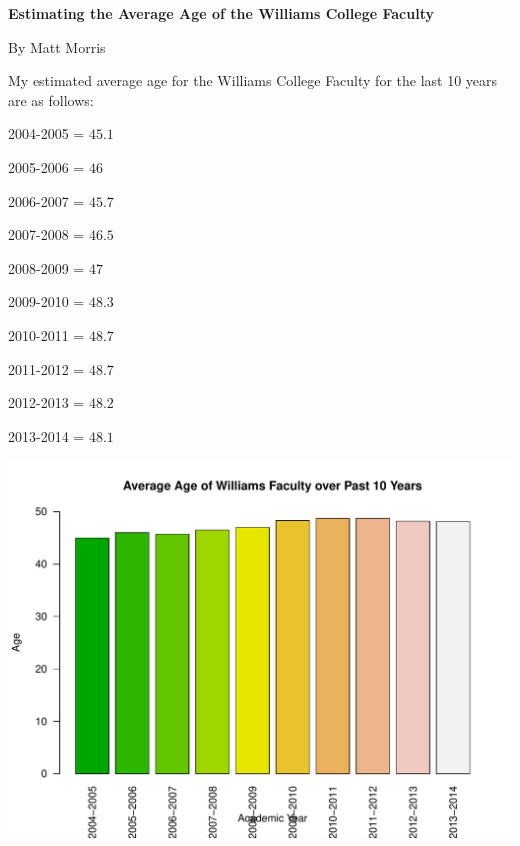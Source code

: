 \documentclass[12pt,a4paper]{article}\usepackage[]{graphicx}\usepackage[]{color}
\makeatletter
\def\maxwidth{ %
  \ifdim\Gin@nat@width>\linewidth
    \linewidth
  \else
    \Gin@nat@width
  \fi
}
\newenvironment{knitrout}{}{} %
\theoremstyle{definition}
\makeatother
\begin{document}
\thispagestyle{empty}
\centerline{\bf{Estimating the Average Age of the Williams College Faculty}}
\bigskip
\centerline{By Matt Morris}

















\bigskip
My estimated average age for the Williams College Faculty for the last 10 years are as follows:

\begin{center}

2004-2005 = \(45.1\)

2005-2006 = \(46\)

2006-2007 = \(45.7\)

2007-2008 = \(46.5\)

2008-2009 = \(47\)

2009-2010 = \(48.3\)

2010-2011 = \(48.7\)

2011-2012 = \(48.7\)

2012-2013 = \(48.2\)

2013-2014 = \(48.1\)

\end{center}


\begin{knitrout}
\color{fgcolor}
\includegraphics[width=\maxwidth]{figure/unnamed-chunk-6-1} 

\end{knitrout}
\end{document}

